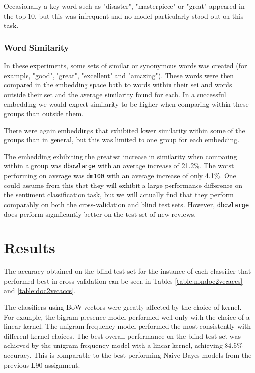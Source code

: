 \documentclass[twocolumn]{article}
\begin{document}
Occasionally a key word such as "disaster", "masterpiece" or "great" appeared in the top 10, but this was infrequent and no model particularly stood out on this task.

\subsubsection{Word Similarity}

In these experiments, some sets of similar or synonymous words was created (for example, "good", "great", "excellent" and "amazing"). These words were then compared in the embedding space both to words within their set and words outside their set and the average similarity found for each. In a successful embedding we would expect similarity to be higher when comparing within these groups than outside them.

There were again embeddings that exhibited lower similarity within some of the groups than in general, but this was limited to one group for each embedding.

The embedding exhibiting the greatest increase in similarity when comparing within a group was \texttt{dbowlarge} with an average increase of 21.2\%. The worst performing on average was \texttt{dm100} with an average increase of only 4.1\%. One could assume from this that they will exhibit a large performance difference on the sentiment classification task, but we will actually find that they perform comparably on both the cross-validation and blind test sets. However, \texttt{dbowlarge} does perform significantly better on the test set of new reviews.


\section{Results}

The accuracy obtained on the blind test set for the instance of each classifier that performed best in cross-validation can be seen in Tables \ref{table:nondoc2vecaccs} and \ref{table:doc2vecaccs}.

The classifiers using BoW vectors were greatly affected by the choice of kernel. For example, the bigram presence model performed well only with the choice of a linear kernel. The unigram frequency model performed the most consistently with different kernel choices. The best overall performance on the blind test set was achieved by the unigram frequency model with a linear kernel, achieving 84.5\% accuracy. This is comparable to the best-performing Naive Bayes models from the previous L90 assignment.
\end{document}
